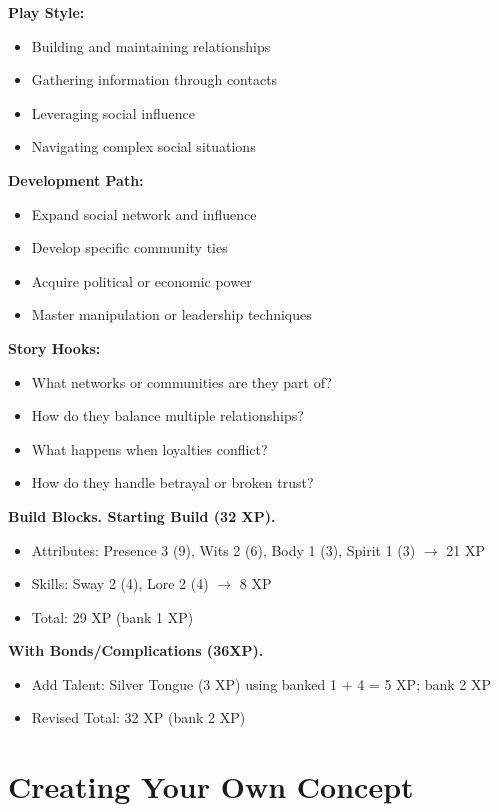 \documentclass[11pt,twoside,openany]{book}
\begin{document}
\textbf{Play Style:}
\begin{itemize}
\item Building and maintaining relationships
\item Gathering information through contacts
\item Leveraging social influence
\item Navigating complex social situations
\end{itemize}

\textbf{Development Path:}
\begin{itemize}
\item Expand social network and influence
\item Develop specific community ties
\item Acquire political or economic power
\item Master manipulation or leadership techniques
\end{itemize}

\textbf{Story Hooks:}
\begin{itemize}
\item What networks or communities are they part of?
\item How do they balance multiple relationships?
\item What happens when loyalties conflict?
\item How do they handle betrayal or broken trust?
\end{itemize}

\textbf{Build Blocks. Starting Build (32 XP).}
\begin{itemize}
\item Attributes: Presence 3 (9), Wits 2 (6), Body 1 (3), Spirit 1 (3) $\rightarrow$ 21 XP
\item Skills: Sway 2 (4), Lore 2 (4) $\rightarrow$ 8 XP
\item Total: 29 XP (bank 1 XP)
\end{itemize}

\textbf{With Bonds/Complications (36XP).}
\begin{itemize}
\item Add Talent: Silver Tongue (3 XP) using banked 1 + 4 = 5 XP; bank 2 XP
\item Revised Total: 32 XP (bank 2 XP)
\end{itemize}

\section*{Creating Your Own Concept} 
\end{document}
